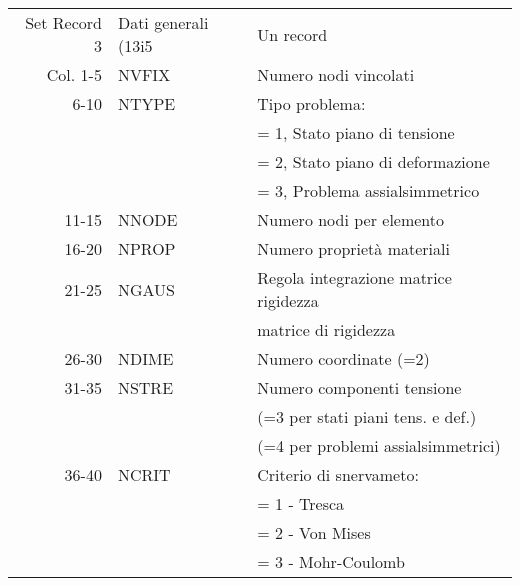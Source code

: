 \begin{tabular}{rll}
	Set Record 3 & Dati generali (13i5            & Un record                                         \\
	Col. 1-5     & NVFIX                          & Numero nodi vincolati                             \\
	6-10         & NTYPE                          & Tipo problema:                                    \\
	             &                                & = 1, Stato piano di tensione                      \\
	             &                                & = 2, Stato piano di deformazione                  \\
	             &                                & = 3, Problema assialsimmetrico                    \\
	11-15        & NNODE                          & Numero nodi per elemento                          \\
	16-20        & NPROP                          & Numero proprietà materiali                        \\
	21-25        & NGAUS                          & Regola integrazione matrice rigidezza             \\
	             &                                & matrice di rigidezza                              \\
	26-30        & NDIME                          & Numero coordinate (=2)                            \\
	31-35        & NSTRE                          & Numero componenti tensione                        \\
	             &                                & (=3 per stati piani tens. e def.)                 \\
	             &                                & (=4 per problemi assialsimmetrici)                \\
	36-40        & NCRIT                          & Criterio di snervameto:                           \\
	             &                                & = 1 - Tresca              	                      \\
	             &                                & = 2 - Von Mises                  	              \\
	             &                                & = 3 - Mohr-Coulomb                                \\

\end{tabular}
